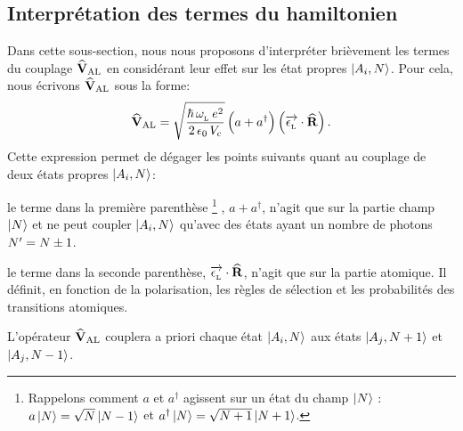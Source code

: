 \subsection{Interprétation des termes du hamiltonien}\label{sec:InterpretationCouplage}
Dans cette sous-section, nous nous proposons d'interpréter brièvement les termes du couplage $\VAL$ en considérant leur effet sur les état propres $\Ket{\AiN}$. Pour cela, nous écrivons $\VAL$ sous la forme:
\begin{equation}
	\VAL = 
	\sqrt{\frac{\hbar\,\pulsLaser\,e^2}{2\,\epsilon_0\,\Vcav}} 
	\, \Bigl( a + a^\dag \Bigr)
	\, \Bigl( \Polarisation \cdot \OperR \Bigr)
	\pointformule
	\label{eq:VALInterpretation}
\end{equation}
Cette expression permet de dégager les points suivants quant au couplage de deux états propres $\Ket{\AiN}$:
\begin{ditemize}
	\item le terme dans la première parenthèse%
	\footnote{Rappelons comment $a$ et $a^\dag$ agissent sur un état du champ $\Ket{N}$ :\\ $a\,\Ket{N} = \sqrt{N}\,\Ket{N-1}$ et $a^\dag\,\Ket{N} = \sqrt{N+1}\,\Ket{N+1}$.}%
	, $a + a^\dag$, n'agit que sur la partie champ $\Ket{N}$ et ne peut coupler $\Ket{\AiN}$ qu'avec des états ayant un nombre de photons $\Nph' = \Nph \pm 1$.
	\item le terme dans la seconde parenthèse, $\Polarisation \cdot \OperR$, n'agit que sur la partie atomique. Il définit, en fonction de la polarisation, les règles de sélection et les probabilités des transitions atomiques.
\end{ditemize}
L'opérateur $\VAL$ couplera a priori chaque état $\Ket{\AiN}$ aux états $\Ket{A_j, \Nph+1}$ et $\Ket{A_j, \Nph-1}$.

\casse

